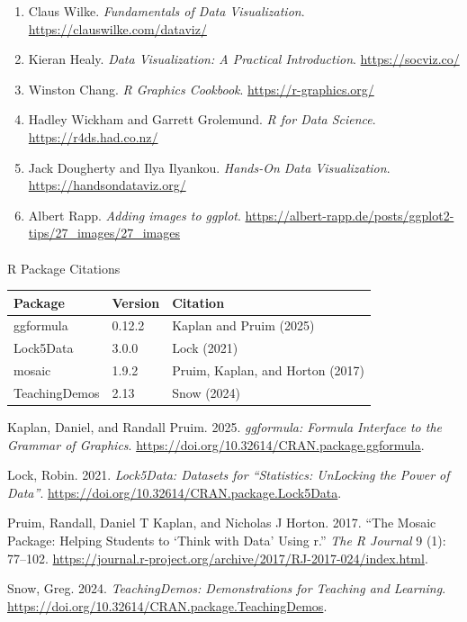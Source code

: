\documentclass[
  letterpaper,
  DIV=11,
  numbers=noendperiod]{scrartcl}
\makeatletter
\let\oldparagraph\paragraph
\renewcommand{\paragraph}{
    \@ifstar
      \xxxParagraphStar
      \xxxParagraphNoStar
  }
\newcommand{\xxxParagraphStar}[1]{\oldparagraph*{#1}\mbox{}}
\newcommand{\xxxParagraphNoStar}[1]{\oldparagraph{#1}\mbox{}}
\newlength{\cslhangindent}
\newenvironment{CSLReferences}[2] %
 {\begin{list}{}{%
  \setlength{\itemindent}{0pt}
  \setlength{\leftmargin}{0pt}
  \setlength{\parsep}{0pt}
  \ifodd #1
   \setlength{\leftmargin}{\cslhangindent}
   \setlength{\itemindent}{-1\cslhangindent}
  \fi
  \setlength{\itemsep}{#2\baselineskip}}}
 {\end{list}}
\providecommand{\tightlist}{%
  \setlength{\itemsep}{0pt}\setlength{\parskip}{0pt}}
\makeatother
\begin{document}
\begin{enumerate}
\def\labelenumi{\arabic{enumi}.}
\tightlist
\item
  Claus Wilke. \emph{Fundamentals of Data Visualization}.
  \url{https://clauswilke.com/dataviz/}
\item
  Kieran Healy. \emph{Data Visualization: A Practical Introduction}.
  \url{https://socviz.co/}
\item
  Winston Chang. \emph{R Graphics Cookbook}.
  \url{https://r-graphics.org/}
\item
  Hadley Wickham and Garrett Grolemund. \emph{R for Data Science}.
  \url{https://r4ds.had.co.nz/}
\item
  Jack Dougherty and Ilya Ilyankou. \emph{Hands-On Data Visualization}.
  \url{https://handsondataviz.org/}
\item
  Albert Rapp. \emph{Adding images to ggplot}.
  \url{https://albert-rapp.de/posts/ggplot2-tips/27_images/27_images}
\end{enumerate}

\label{refs}
\begin{CSLReferences}{1}{0}
\paragraph{\texorpdfstring{ R Package
Citations}{ R Package Citations}}\label{r-package-citations}

\begin{longtable}[]{@{}lll@{}}
\toprule\noalign{}
Package & Version & Citation \\
\midrule\noalign{}
\endhead
\bottomrule\noalign{}
\endlastfoot
ggformula & 0.12.2 & Kaplan and Pruim (2025) \\
Lock5Data & 3.0.0 & Lock (2021) \\
mosaic & 1.9.2 & Pruim, Kaplan, and Horton (2017) \\
TeachingDemos & 2.13 & Snow (2024) \\
\end{longtable}

Kaplan, Daniel, and Randall Pruim. 2025. \emph{{ggformula}: Formula
Interface to the Grammar of Graphics}.
\url{https://doi.org/10.32614/CRAN.package.ggformula}.

Lock, Robin. 2021. \emph{Lock5Data: Datasets for {``{Statistics:
UnLocking the Power of Data}''}}.
\url{https://doi.org/10.32614/CRAN.package.Lock5Data}.

Pruim, Randall, Daniel T Kaplan, and Nicholas J Horton. 2017. {``The
Mosaic Package: Helping Students to {`{Think with Data}'} Using r.''}
\emph{The R Journal} 9 (1): 77--102.
\url{https://journal.r-project.org/archive/2017/RJ-2017-024/index.html}.

Snow, Greg. 2024. \emph{{TeachingDemos}: Demonstrations for Teaching and
Learning}. \url{https://doi.org/10.32614/CRAN.package.TeachingDemos}.

\end{CSLReferences}
\end{document}
